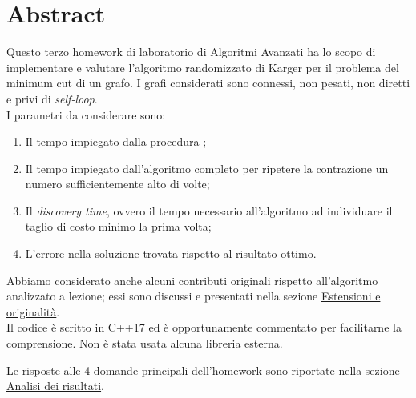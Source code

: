 \section{Abstract}
\label{cap:abstract}

Questo terzo homework di laboratorio di Algoritmi Avanzati ha lo scopo di implementare e valutare l'algoritmo randomizzato di Karger per il problema del minimum cut di un grafo. I grafi considerati sono connessi, non pesati, non diretti e privi di \textit{self-loop}. \\

\noindent I parametri da considerare sono:

\begin{enumerate}
    \item Il tempo impiegato dalla procedura ;
    \item Il tempo impiegato dall'algoritmo completo per ripetere la contrazione un numero sufficientemente alto di volte;
    \item Il \textit{discovery time}, ovvero il tempo necessario all'algoritmo ad individuare il taglio di costo minimo la prima volta;
    \item L'errore nella soluzione trovata rispetto al risultato ottimo.
\end{enumerate}

\noindent Abbiamo considerato anche alcuni contributi originali rispetto all'algoritmo analizzato a lezione; essi sono discussi e presentati nella sezione \hyperref[cap:extensions-and-originalities]{Estensioni e originalità}. \\

\noindent Il codice è scritto in C++17 ed è opportunamente commentato per facilitarne la comprensione. Non è stata usata alcuna libreria esterna.

\noindent Le risposte alle 4 domande principali dell'homework sono riportate nella sezione \hyperref[cap:performance-analysis]{Analisi dei risultati}.
